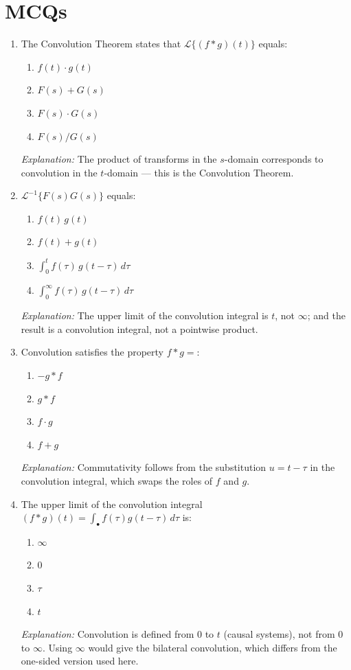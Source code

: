\documentclass[12pt,a4paper]{article}
\begin{document}
\section{MCQs}

\begin{enumerate}[label=\textbf{MCQ \arabic*.}, leftmargin=*, itemsep=14pt]

\item The Convolution Theorem states that $\mathcal{L}\{(f*g)(t)\}$ equals:
\begin{enumerate}[label=(\alph*)]
\item $f(t)\cdot g(t)$
\item $F(s)+G(s)$
\item \textbf{$F(s)\cdot G(s)$}
\item $F(s)/G(s)$
\end{enumerate}
\textit{Explanation:} The product of transforms in the $s$-domain corresponds to
convolution in the $t$-domain --- this is the Convolution Theorem.

\item $\mathcal{L}^{-1}\{F(s)G(s)\}$ equals:
\begin{enumerate}[label=(\alph*)]
\item $f(t)\,g(t)$
\item $f(t)+g(t)$
\item \textbf{$\displaystyle\int_0^t f(\tau)\,g(t-\tau)\,d\tau$}
\item $\displaystyle\int_0^\infty f(\tau)\,g(t-\tau)\,d\tau$
\end{enumerate}
\textit{Explanation:} The upper limit of the convolution integral is $t$, not
$\infty$; and the result is a convolution integral, not a pointwise product.

\item Convolution satisfies the property $f * g =$:
\begin{enumerate}[label=(\alph*)]
\item $-g * f$
\item \textbf{$g * f$}
\item $f \cdot g$
\item $f + g$
\end{enumerate}
\textit{Explanation:} Commutativity follows from the substitution $u = t-\tau$
in the convolution integral, which swaps the roles of $f$ and $g$.

\item The upper limit of the convolution integral $(f*g)(t) = \int_\bullet f(\tau)g(t-\tau)\,d\tau$ is:
\begin{enumerate}[label=(\alph*)]
\item $\infty$
\item $0$
\item $\tau$
\item \textbf{$t$}
\end{enumerate}
\textit{Explanation:} Convolution is defined from $0$ to $t$ (causal systems),
not from $0$ to $\infty$. Using $\infty$ would give the bilateral convolution,
which differs from the one-sided version used here.


\end{enumerate}
\end{document}
